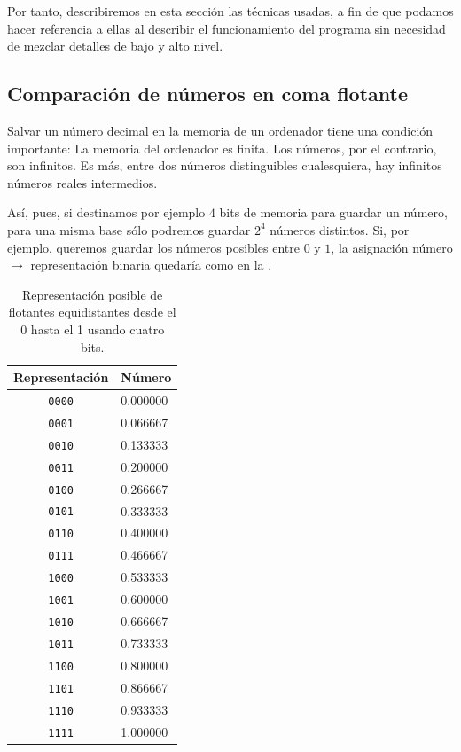 Por tanto, describiremos en esta sección las técnicas usadas, a fin de que podamos hacer referencia a ellas al 
describir el funcionamiento del programa sin necesidad de mezclar detalles de bajo y alto nivel.

\subsection{Comparación de números en coma flotante}
Salvar un número decimal en la memoria de un ordenador tiene una condición importante: La memoria del ordenador es 
finita. Los números, por el contrario, son infinitos. Es más, entre dos números distinguibles cualesquiera, hay 
infinitos números reales intermedios.

Así, pues, si destinamos por ejemplo $4$ bits de memoria para guardar un número, para una misma base sólo podremos 
guardar $2^{4}$ números distintos. Si, por ejemplo, queremos guardar los números posibles entre $0$ y $1$, la 
asignación número $\rightarrow$ representación binaria quedaría como en la .

\begin{table}
\begin{tabular}{cl}
 Representación & Número \\\hline
  \texttt{0000} & 0.000000 \\
  \texttt{0001} & 0.066667 \\
  \texttt{0010} & 0.133333 \\
  \texttt{0011} & 0.200000 \\
  \texttt{0100} & 0.266667 \\
  \texttt{0101} & 0.333333 \\
  \texttt{0110} & 0.400000 \\
  \texttt{0111} & 0.466667 \\
  \texttt{1000} & 0.533333 \\
  \texttt{1001} & 0.600000 \\
  \texttt{1010} & 0.666667 \\
  \texttt{1011} & 0.733333 \\
  \texttt{1100} & 0.800000 \\
  \texttt{1101} & 0.866667 \\
  \texttt{1110} & 0.933333 \\
  \texttt{1111} & 1.000000
 \end{tabular}
 \caption{Representación posible de flotantes equidistantes desde el 0 hasta el 1 usando cuatro bits.}
\end{table}

